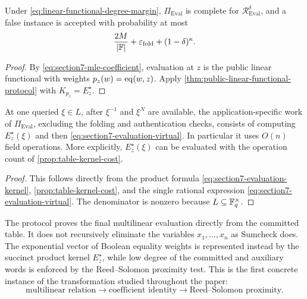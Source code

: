 \begin{corollary}
\label{cor:table-evaluation-soundness}
Under \eqref{eq:linear-functional-degree-margin}, \(\Pi_{\mathrm{Eval}}\) is complete for \(\mathcal R^{\delta}_{\mathrm{Eval}}\), and a false instance is accepted with probability at most
\begin{equation}
  \frac{2M}{|\mathbb{F}|}
  +\varepsilon_{\mathrm{fold}}
  +(1-\delta)^\kappa.
  \label{eq:table-evaluation-soundness}
\end{equation}
\end{corollary}

\begin{proof}
By \eqref{eq:section7-mle-coefficient}, evaluation at \(z\) is the public linear functional with weights \(p_z(w)=\operatorname{eq}(w,z)\).  Apply \cref{thm:public-linear-functional-protocol} with \(K_{p_z}=E_z^{\star}\).
\end{proof}

\begin{proposition}
\label{prop:table-evaluation-verifier-cost}
At one queried \(\xi\in L\), after \(\xi^{-1}\) and \(\xi^N\) are available, the application-specific work of \(\Pi_{\mathrm{Eval}}\), excluding the folding and authentication checks, consists of computing \(E_z^{\star}(\xi)\) and then \eqref{eq:section7-evaluation-virtual}.  In particular it uses \(O(n)\) field operations.  More explicitly, \(E_z^{\star}(\xi)\) can be evaluated with the operation count of \cref{prop:table-kernel-cost}.
\end{proposition}

\begin{proof}
This follows directly from the product formula \eqref{eq:section7-evaluation-kernel}, \cref{prop:table-kernel-cost}, and the single rational expression \eqref{eq:section7-evaluation-virtual}.  The denominator is nonzero because \(L\subseteq\mathbb{F}_q^\times\).
\end{proof}

\begin{remark}
\label{rem:evaluation-no-sumcheck}
The protocol proves the final multilinear evaluation directly from the committed table.  It does not recursively eliminate the variables \(x_1,\ldots,x_n\) as Sumcheck does.  The exponential vector of Boolean equality weights is represented instead by the succinct product kernel \(E_z^{\star}\), while low degree of the committed and auxiliary words is enforced by the Reed--Solomon proximity test.  This is the first concrete instance of the transformation studied throughout the paper:
\[
  \text{multilinear relation}
  \longrightarrow
  \text{coefficient identity}
  \longrightarrow
  \text{Reed--Solomon proximity}.
\]
\end{remark}

